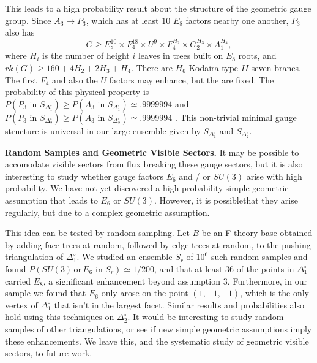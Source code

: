 \documentclass[aps,prl,twocolumn, superscriptaddress,groupedaddress,nofootinbib]{revtex4-1}
\newcommand{\sdoc}{S_{\Delta_1^\circ}}
\newcommand{\sdtc}{S_{\Delta_2^\circ}}
\newcommand{\doc}{{\Delta_1^\circ}}
\newcommand{\dtc}{{\Delta_2^\circ}}
\newcommand{\textin}{\,\, \text{in} \,\,}
\newcommand{\XXX}[3]{{\color{blue}{\bf [#1: } {\tt #3} {\it -#2-}{\bf ]}}}
\begin{document}
This leads to a high probability result about the structure of the geometric gauge group.
Since $A_3\to P_3$, which has at least $10$ $E_8$ factors nearby one another, $P_3$
also has
\begin{equation}
G\geq E_8^{10} \times F_4^{18}\times U^9 \times F_4^{H_2}\times G_2^{H_3}\times A_1^{H_4},
\end{equation}
where $H_i$ is the number of height $i$ leaves in trees built on $E_8$ roots,
and $rk(G)\geq 160+4H_2+2H_3+H_4$.
There are $H_6$ Kodaira type $II$ seven-branes. The first $F_4$ and also
the $U$ factors may enhance, but the  are fixed. The probability
of this physical property is $P(P_3\textin \sdoc)\geq P(A_3\textin \sdoc) \simeq .9999994$ and $P(P_3\textin \sdtc)\geq P(A_3\textin \sdtc) \simeq .9999994$ . This non-trivial minimal gauge structure is universal in our large ensemble given by $\sdoc$ and $\sdtc$.



\vspace{.2cm}
\noindent \textbf{Random Samples and Geometric Visible Sectors.} 
It may be possible to accomodate visible sectors from flux breaking
these gauge sectors, but it is also interesting to study whether gauge
factors $E_6$ and / or $SU(3)$ arise with high probability.
We have not yet discovered a high probability simple geometric assumption
that leads to $E_6$ or $SU(3)$. However, it is possiblethat they arise regularly,
but due to a complex geometric assumption.

This idea can be tested by random sampling. Let $B$ be an F-theory base obtained
by adding face trees at random, followed by edge trees at random, to the pushing 
triangulation of $\doc$. We studied an ensemble $S_r$ of $10^6$ such random samples 
and found $P(SU(3) \, \text{or} \, E_6 \textin S_r)\simeq 1/200$, and that at least 
$36$ of the points in $\doc$ carried $E_8$, a significant enhancement beyond
assumption $3$.  Furthermore, in our sample we found that $E_6$ only
arose on the point $(1,-1,-1)$, which is the only vertex of $\doc$
that isn't in the largest facet.  Similar results and probabilities also hold
using this techniques on $\dtc$. It would be interesting to study random samples of other triangulations, or
see if new simple geometric assumptions imply these enhancements. We leave this,
and the systematic study of geometric visible sectors, to future work.
\end{document}

